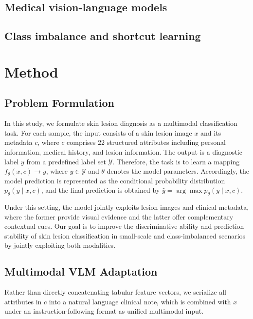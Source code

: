 \documentclass[preprint,12pt]{elsarticle}
\begin{document}
\subsection{Medical vision-language models}
\subsection{Class imbalance and shortcut learning
}

\section{Method}



\subsection{Problem Formulation}

In this study, we formulate skin lesion diagnosis as a multimodal classification task. For each sample, the input consists of a skin lesion image $x$ and its metadata $c$, where $c$ comprises 22 structured attributes including personal information, medical history, and lesion information. The output is a diagnostic label $y$ from a predefined label set $\mathcal{Y}$. Therefore, the task is to learn a mapping $f_{\theta}(x,c) \rightarrow y$, where $y \in \mathcal{Y}$ and $\theta$ denotes the model parameters. Accordingly, the model prediction is represented as the conditional probability distribution $p_{\theta}(y \mid x,c)$, and the final prediction is obtained by $\hat{y} = \arg\max p_{\theta}(y \mid x,c)$.


Under this setting, the model jointly exploits lesion images and clinical metadata, where the former provide visual evidence and the latter offer complementary contextual cues. Our goal is to improve the discriminative ability and prediction stability of skin lesion classification in small-scale and class-imbalanced scenarios by jointly exploiting both modalities.


\subsection{Multimodal VLM Adaptation}

Rather than directly concatenating tabular feature vectors, we serialize all attributes in $c$ into a natural language clinical note, which is combined with $x$ under an instruction-following format as unified multimodal input.
\end{document}
